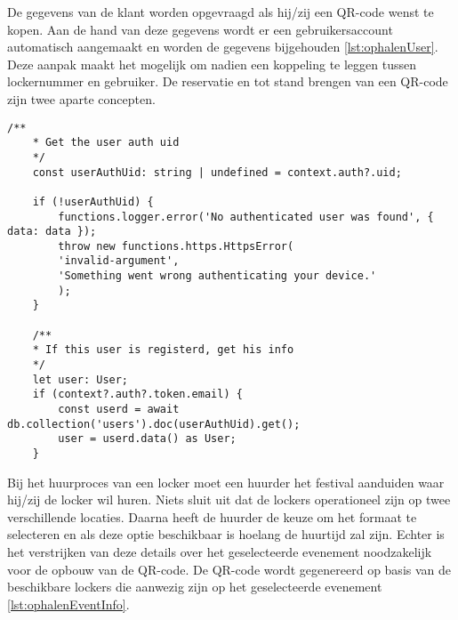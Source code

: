 \vspace{7}
De gegevens van de klant worden opgevraagd als hij/zij een QR-code wenst te kopen. Aan de hand van deze gegevens wordt er een gebruikersaccount automatisch aangemaakt en worden de gegevens bijgehouden \ref{lst:ophalenUser}. Deze aanpak maakt het mogelijk om nadien een koppeling te leggen tussen lockernummer en gebruiker. De reservatie en tot stand brengen van een QR-code zijn twee aparte concepten.
\begin{lstlisting}[caption={Ophalen de zopas aangemaakte gebruiker zijn gegevens indien hij in het huur proces terecht gekomen is.}, label={lst:ophalenUser}]
    /**
    * Get the user auth uid
    */
    const userAuthUid: string | undefined = context.auth?.uid;
    
    if (!userAuthUid) {
        functions.logger.error('No authenticated user was found', { data: data });
        throw new functions.https.HttpsError(
        'invalid-argument',
        'Something went wrong authenticating your device.'
        );
    }
    
    /**
    * If this user is registerd, get his info
    */
    let user: User;
    if (context?.auth?.token.email) {
        const userd = await db.collection('users').doc(userAuthUid).get();
        user = userd.data() as User;
    }
\end{lstlisting}

Bij het huurproces van een locker moet een huurder het festival aanduiden waar hij/zij de locker wil huren. Niets sluit uit dat de lockers operationeel zijn op twee verschillende locaties. Daarna heeft de huurder de keuze om het formaat te selecteren en als deze optie beschikbaar is hoelang de huurtijd zal zijn. Echter is het verstrijken van deze details over het geselecteerde evenement noodzakelijk voor de opbouw van de QR-code. De QR-code wordt gegenereerd op basis van de beschikbare lockers die aanwezig zijn op het geselecteerde evenement \ref{lst:ophalenEventInfo}.

